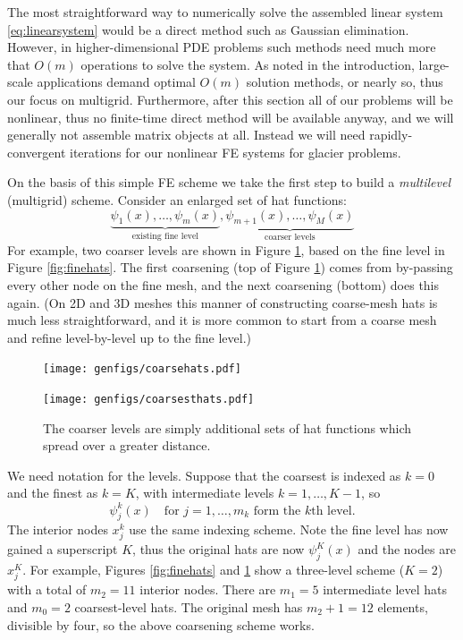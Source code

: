 \documentclass[letterpaper,final,12pt,reqno]{amsart}
\begin{document}
The most straightforward way to numerically solve the assembled linear system \eqref{eq:linearsystem} would be a direct method such as Gaussian elimination.  However, in higher-dimensional PDE problems such methods need much more that $O(m)$ operations to solve the system.  As noted in the introduction, large-scale applications demand optimal $O(m)$ solution methods, or nearly so, thus our focus on multigrid.  Furthermore, after this section all of our problems will be nonlinear, thus no finite-time direct method will be available anyway, and we will generally not assemble matrix objects at all.  Instead we will need rapidly-convergent iterations for our nonlinear FE systems for glacier problems.

On the basis of this simple FE scheme we take the first step to build a \emph{multilevel} (multigrid) scheme.  Consider an enlarged set of hat functions:
    $$\underbrace{\psi_1(x),\dots,\psi_m(x)}_{\text{existing fine level}},\underbrace{\psi_{m+1}(x),\dots,\psi_M(x)}_{\text{coarser levels}}$$
For example, two coarser levels are shown in Figure \ref{fig:coarsehats}, based on the fine level in Figure \ref{fig:finehats}.  The first coarsening (top of Figure \ref{fig:coarsehats}) comes from by-passing every other node on the fine mesh, and the next coarsening (bottom) does this again.  (On 2D and 3D meshes this manner of constructing coarse-mesh hats is much less straightforward, and it is more common to start from a coarse mesh and refine level-by-level up to the fine level.)

\begin{figure}
\texttt{[image: genfigs/coarsehats.pdf]}
\smallskip

\texttt{[image: genfigs/coarsesthats.pdf]}
\caption{The coarser levels are simply additional sets of hat functions which spread over a greater distance.}
\label{fig:coarsehats}
\end{figure}

We need notation for the levels.  Suppose that the coarsest is indexed as $k=0$ and the finest as $k=K$, with intermediate levels $k=1,\dots,K-1$, so
\begin{equation}
  \psi_j^k(x) \quad \text{for } j=1,\dots,m_k \text{ form the $k$th level}.  \label{eq:definepsijk}
\end{equation}
The interior nodes $x_j^k$ use the same indexing scheme.  Note the fine level has now gained a superscript $K$, thus the original hats are now $\psi_j^K(x)$ and the nodes are $x_j^K$.  For example, Figures \ref{fig:finehats} and \ref{fig:coarsehats} show a three-level scheme ($K=2$) with a total of $m_2=11$ interior nodes.  There are $m_1=5$ intermediate level hats and $m_0=2$ coarsest-level hats.  The original mesh has $m_2+1=12$ elements, divisible by four, so the above coarsening scheme works.
\end{document}
